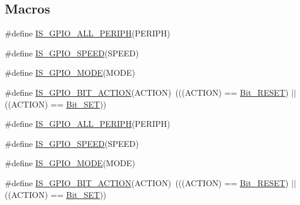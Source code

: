 \subsection*{Macros}
\begin{DoxyCompactItemize}
\item 
\#define \hyperlink{group___g_p_i_o___exported___types_ga68b2a1f0b05c13978217db5439c7f790}{I\+S\+\_\+\+G\+P\+I\+O\+\_\+\+A\+L\+L\+\_\+\+P\+E\+R\+I\+PH}(P\+E\+R\+I\+PH)
\item 
\#define \hyperlink{group___g_p_i_o___exported___types_ga888e1f951df2fe9dbf827528051a3a56}{I\+S\+\_\+\+G\+P\+I\+O\+\_\+\+S\+P\+E\+ED}(S\+P\+E\+ED)
\item 
\#define \hyperlink{group___g_p_i_o___exported___types_gacc5fde3eef57ec3c558c11d0011d900c}{I\+S\+\_\+\+G\+P\+I\+O\+\_\+\+M\+O\+DE}(M\+O\+DE)
\item 
\#define \hyperlink{group___g_p_i_o___exported___types_ga6b882caa8ed9857c5c7267959a7818c5}{I\+S\+\_\+\+G\+P\+I\+O\+\_\+\+B\+I\+T\+\_\+\+A\+C\+T\+I\+ON}(A\+C\+T\+I\+ON)~(((A\+C\+T\+I\+ON) == \hyperlink{group___g_p_i_o___exported___types_ga176130b21c0e719121470a6042d4cf19ae2c026f2b44a949f82a65f3385edef09}{Bit\+\_\+\+R\+E\+S\+ET}) $\vert$$\vert$ ((A\+C\+T\+I\+ON) == \hyperlink{group___g_p_i_o___exported___types_ga176130b21c0e719121470a6042d4cf19a3c477841a6ceec13fe47ef322432b992}{Bit\+\_\+\+S\+ET}))
\item 
\#define \hyperlink{group___g_p_i_o___exported___types_ga68b2a1f0b05c13978217db5439c7f790}{I\+S\+\_\+\+G\+P\+I\+O\+\_\+\+A\+L\+L\+\_\+\+P\+E\+R\+I\+PH}(P\+E\+R\+I\+PH)
\item 
\#define \hyperlink{group___g_p_i_o___exported___types_ga888e1f951df2fe9dbf827528051a3a56}{I\+S\+\_\+\+G\+P\+I\+O\+\_\+\+S\+P\+E\+ED}(S\+P\+E\+ED)
\item 
\#define \hyperlink{group___g_p_i_o___exported___types_gacc5fde3eef57ec3c558c11d0011d900c}{I\+S\+\_\+\+G\+P\+I\+O\+\_\+\+M\+O\+DE}(M\+O\+DE)
\item 
\#define \hyperlink{group___g_p_i_o___exported___types_ga6b882caa8ed9857c5c7267959a7818c5}{I\+S\+\_\+\+G\+P\+I\+O\+\_\+\+B\+I\+T\+\_\+\+A\+C\+T\+I\+ON}(A\+C\+T\+I\+ON)~(((A\+C\+T\+I\+ON) == \hyperlink{group___g_p_i_o___exported___types_ga176130b21c0e719121470a6042d4cf19ae2c026f2b44a949f82a65f3385edef09}{Bit\+\_\+\+R\+E\+S\+ET}) $\vert$$\vert$ ((A\+C\+T\+I\+ON) == \hyperlink{group___g_p_i_o___exported___types_ga176130b21c0e719121470a6042d4cf19a3c477841a6ceec13fe47ef322432b992}{Bit\+\_\+\+S\+ET}))
\end{DoxyCompactItemize}

